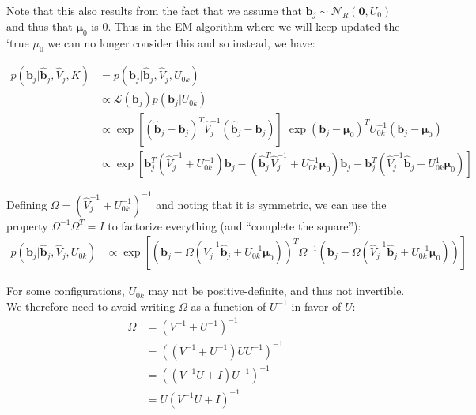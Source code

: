 \documentclass[11pt, oneside]{article}   	%
\newcommand{\Norm}{{\mathcal{N}}} %
\newcommand{\Lik}{{\mathcal{L}}} %
\begin{document}
Note that this also results from the fact that we assume that $\bm{b}_{j} \sim \Norm_R(\bm{0}, U_{0})$
and thus that $\bm{\mu}_{0}$ is 0. Thus in the EM algorithm where we will keep updated the `true $\mu_{0}$ we can no longer consider this and so instead, we have:




\begin{equation}
  \begin{aligned}
    p(\bm{b}_{j} | \hat{\bm{b}}_{j}, \hat{V}_{j}, K) &= p(\bm{b}_{j} | \hat{\bm{b}}_{j}, \hat{V}_{j}, U_{0k}) \\
    &\propto \Lik(\bm{b}_{j}) p(\bm{b}_{j} | U_{0k}) \\
    &\propto \exp[(\hat{\bm{b}}_{j} - \bm{b}_{j})^T \hat{V}_{j}^{-1} (\hat{\bm{b}}_{j} - \bm{b}_{j})] \; \exp(\bm{b}_{j}-\bm{\mu}_{0})^T U_{0k}^{-1} (\bm{b}_{j}-\bm{\mu}_{0}) \\
    &\propto \exp[\bm{b}_{j}^T (\hat{V}_{j}^{-1} + U_{0k}^{-1}) \bm{b}_{j} - ( \hat{\bm{b}}_{j} ^{T} \hat{V}_{j}^{-1} + U_{0k}^{-1}\bm{\mu}_{0}) \bm{b}_{j} - \bm{b}_{j}^T (\hat{V}_{j}^{-1} \hat{\bm{b}}_{j} + U_{0k}^{1}\bm{\mu}_{0})]
  \end{aligned}
\end{equation}




Defining $\Omega = (\hat{V}_{j}^{-1} + U_{0k}^{-1})^{-1}$ and noting that it is symmetric, we can use the property $\Omega^{-1} \Omega^T = I$ to factorize everything (and ``complete the square''):
\begin{equation}
  \begin{aligned}
    p(\bm{b}_{j} | \hat{\bm{b}}_{j}, \hat{V}_{j}, U_{0k}) &\propto \exp[(\bm{b}_{j} - \Omega (\hat{V}_{j}^{-1} \hat{\bm{b}}_{j} + U_{0k}^{-1} \bm{\mu}_{0}))^T \Omega^{-1} (\bm{b}_{j} - \Omega (\hat{V}_{j}^{-1} \hat{\bm{b}}_{j} + U_{0k}^{-1} \bm{\mu}_{0}))]
  \end{aligned}
\end{equation}

For some configurations, $U_{0k}$ may not be positive-definite, and thus not invertible.
We therefore need to avoid writing $\Omega$ as a function of $U^{-1}$ in favor of $U$:
\begin{equation}
  \label{omega}
  \begin{aligned}
    \Omega &= (V^{-1} + U^{-1})^{-1} \\
    &= ((V^{-1} + U^{-1}) U U^{-1})^{-1} \\
    &= ((V^{-1} U + I) U^{-1})^{-1} \\
    &= U (V^{-1} U + I)^{-1}
  \end{aligned}
\end{equation}
\end{document}
